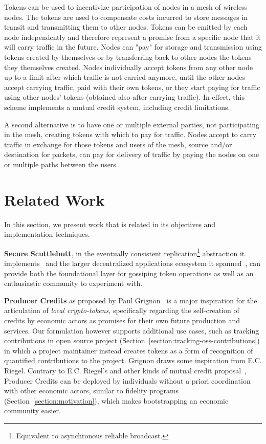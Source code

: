\documentclass[sigplan,screen,10pt]{acmart}
\begin{document}
Tokens can be used to incentivize participation of nodes in a mesh of wireless nodes. The tokens are used to compensate  costs incurred to store messages in transit and transmitting them to other nodes. Tokens can be emitted by each node independently and therefore represent a promise from a specific node that it will carry traffic in the future. Nodes can "pay" for storage and transmission using tokens created by themselves or by transferring back to other nodes the tokens they themselves created. Nodes individually accept tokens from any other node up to a limit after which traffic is not carried anymore, until the other nodes accept carrying traffic, paid with their own tokens, or they start paying for traffic using other nodes' tokens (obtained also after carrying traffic). In effect, this scheme implements a mutual credit system, including credit limitations.

A second alternative is to have one or multiple external parties, not participating in the mesh, creating tokens with which to pay for traffic. Nodes accept to carry traffic in exchange for those tokens and users of the mesh, source and/or destination for packets, can pay for delivery of traffic by paying the nodes on one or multiple paths between the users.

\section{Related Work}
\label{section:related-work}

In this section, we present work that is related in its objectives and implementation techniques.

\textbf{Secure Scuttlebutt}, in the eventually consistent replication\footnote{Equivalent to asynchronous reliable broadcast.} abstraction it implements~\cite{kermarrec2020gossiping} and the larger decentralized applications ecosystem it spanned~\cite{tarr2019ssb}, can provide both the foundational layer for gossiping token operations as well as an enthusiastic community to experiment with.

\textbf{Producer Credits} as proposed by Paul Grignon~\cite{producercredit} is a major inspiration for the articulation of \textit{local crypto-tokens}, specifically regarding the self-creation of credits by economic actors as promises for their own future production and services. Our formulation however supports additional use cases, such as tracking contributions in open source project (Section~\ref{section:tracking-oss-contributions}) in which a project maintainer instead creates tokens as a form of recognition of quantified contributions to the project. Grignon draws some inspiration from E.C. Riegel. Contrary to E.C. Riegel's and other kinds of mutual credit proposal~\cite{mutualcredit}, Producer Credits can be deployed by individuals without a priori coordination with other economic actors, similar to fidelity programs (Section~\ref{section:motivation}), which makes bootstrapping an economic community easier.
\end{document}
